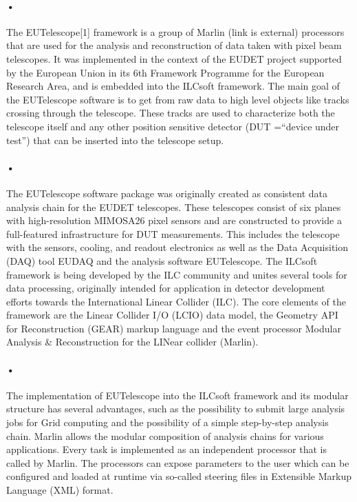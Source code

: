 \documentclass[11pt]{article}
\begin{document}
\paragraph{•}
The EUTelescope[1] framework is a group of Marlin (link is external) processors that are used for the analysis and reconstruction of data taken with pixel beam telescopes. It was implemented in the context of the EUDET project supported by the European Union in its 6th Framework Programme for the European Research Area, and is embedded into the ILCsoft framework. The main goal of the EUTelescope software is to get from raw data to high level objects like tracks crossing through the telescope. These tracks are used to characterize both the telescope itself and any other position sensitive detector (DUT =``device under test'') that can be inserted into the telescope setup.
\paragraph{•}
The EUTelescope software package was originally created as consistent data analysis chain for the EUDET telescopes. These telescopes consist of six planes with high-resolution MIMOSA26 pixel sensors and are constructed to provide a full-featured infrastructure for DUT measurements. This includes the telescope with the sensors, cooling, and readout electronics as well as the Data Acquisition (DAQ) tool EUDAQ and the analysis software EUTelescope. The ILCsoft framework is being developed by the ILC community and unites several tools for data processing, originally intended for application in detector development efforts towards the International Linear Collider (ILC). The core elements of the framework are the Linear Collider I/O (LCIO) data model, the Geometry API for Reconstruction (GEAR) markup language and the event processor Modular Analysis \& Reconstruction for the LINear collider (Marlin).
\paragraph{•}
The implementation of EUTelescope into the ILCsoft framework and its modular structure has several advantages, such as the possibility to submit large analysis jobs for Grid computing and the possibility of a simple step-by-step analysis chain. Marlin allows the modular composition of analysis chains for various applications. Every task is implemented as an independent processor that is called by Marlin. The processors can expose parameters to the user which can be configured and loaded at runtime via so-called steering files in Extensible Markup Language (XML) format.
\end{document}
